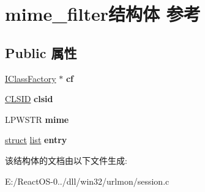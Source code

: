 \hypertarget{structmime__filter}{}\section{mime\+\_\+filter结构体 参考}
\label{structmime__filter}
\subsection*{Public 属性}
\begin{DoxyCompactItemize}
\item 
\mbox{\label{structmime__filter_a24301f0f77a08c940fbe475a942a2ff8}} 
\hyperlink{interface_i_class_factory}{I\+Class\+Factory} $\ast$ {\bfseries cf}
\item 
\mbox{\label{structmime__filter_a12d540dd68018d6647c05b417e0b949e}} 
\hyperlink{struct___i_i_d}{C\+L\+S\+ID} {\bfseries clsid}
\item 
\mbox{\label{structmime__filter_a4c0c4be620c651ad9daabfa26c43978c}} 
L\+P\+W\+S\+TR {\bfseries mime}
\item 
\mbox{\label{structmime__filter_afdca38a1bbbbccb6ad1ef92ab1a313b8}} 
\hyperlink{interfacestruct}{struct} \hyperlink{classlist}{list} {\bfseries entry}
\end{DoxyCompactItemize}


该结构体的文档由以下文件生成\+:\begin{DoxyCompactItemize}
\item 
E\+:/\+React\+O\+S-\/0../dll/win32/urlmon/session.\+c\end{DoxyCompactItemize}
